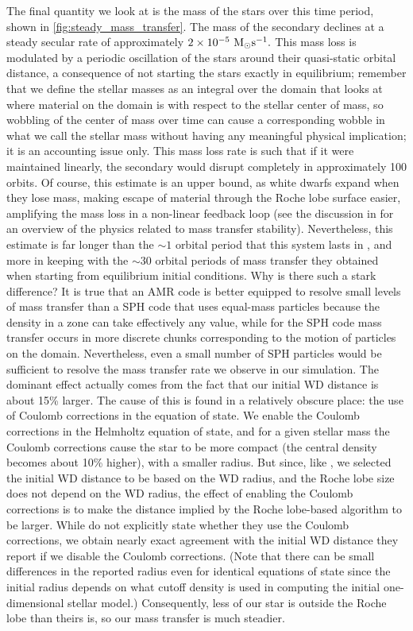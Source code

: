 \documentclass[12pt]{article}
\begin{document}
The final quantity we look at is the mass of the stars over this time period, shown in \ref{fig:steady_mass_transfer}.
The mass of the secondary declines at a steady secular rate of approximately $2 \times 10^{-5}\ \mathrm{M}_\odot \text{s}^{-1}.$
This mass loss is modulated by a periodic oscillation of the stars around their quasi-static orbital distance,
a consequence of not starting the stars exactly in equilibrium; remember that we define the stellar masses
as an integral over the domain that looks at where material on the domain is with respect to the stellar
center of mass, so wobbling of the center of mass over time can cause a corresponding wobble in what we
call the stellar mass without having any meaningful physical implication; it is an accounting issue only.
This mass loss rate is such that if it were maintained linearly, the secondary would disrupt completely in
approximately 100 orbits. Of course, this estimate is an upper bound, as white dwarfs expand when
they lose mass, making escape of material through the Roche lobe surface easier, amplifying the mass loss
in a non-linear feedback loop (see the discussion in \citet[Section 2]{dan:2011} for an overview of the
physics related to mass transfer stability). Nevertheless, this estimate is far longer than the $\sim 1$
orbital period that this system lasts in \citet{dan:2011}, and more in keeping with the $\sim 30$ orbital
periods of mass transfer they obtained when starting from equilibrium initial conditions. Why is there
such a stark difference? It is true that an AMR code is better equipped to resolve small levels of mass transfer
than a SPH code that uses equal-mass particles because the density in a zone can take effectively
any value, while for the SPH code mass transfer occurs in more discrete chunks corresponding to the motion of
particles on the domain. Nevertheless, even a small number of SPH particles would be sufficient to
resolve the mass transfer rate we observe in our simulation. The dominant effect actually comes from
the fact that our initial WD distance is about 15\% larger. The cause of this is found in
a relatively obscure place: the use of Coulomb corrections in the equation of state. We enable the Coulomb
corrections in the Helmholtz equation of state, and for a given stellar mass the Coulomb corrections cause
the star to be more compact (the central density becomes about 10\% higher), with a smaller radius. But since,
like \citeauthor{dan:2011}, we selected the initial WD distance to be based on the WD radius, and the Roche lobe
size does not depend on the WD radius, the effect of enabling the Coulomb corrections is to make the distance
implied by the Roche lobe-based algorithm to be larger. While \citeauthor{dan:2011} do not explicitly state whether
they use the Coulomb corrections, we obtain nearly exact agreement with the initial WD distance they report
if we disable the Coulomb corrections. (Note that there can be small differences in the reported radius
even for identical equations of state since the initial radius depends on what cutoff density is used in
computing the initial one-dimensional stellar model.) Consequently, less of our star is outside the
Roche lobe than theirs is, so our mass transfer is much steadier.
\end{document}
